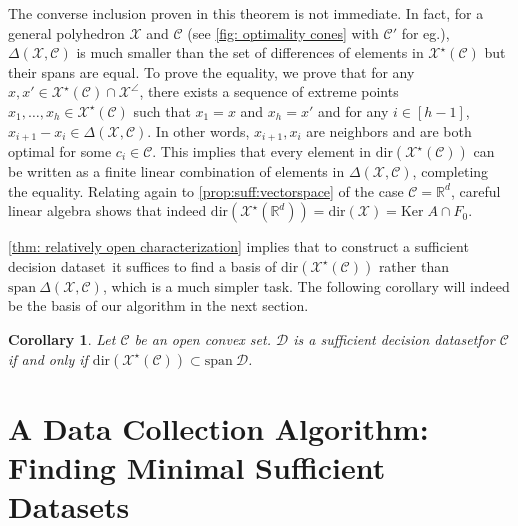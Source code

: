 \documentclass[11pt]{article}
\theoremstyle{plain}
\newtheorem{corollary}{Corollary}
\theoremstyle{definition}
\newcommand{\Ker}[0]{\mathrm{Ker}\;}
\newcommand{\Vect}{\mathrm{span}~}
\newcommand{\dataset}[0]{\mathcal D}
\newcommand{\sufficient}{sufficient decision dataset}
\newcommand{\cQ}{\mathcal Q}
\newcommand{\dualpoly}[2]{#1^\star\left(#2\right)}
\newcommand{\cX}{\mathcal{X}}
\newcommand{\cC}{\mathcal{C}}
\newcommand{\cD}{\mathcal{D}}
\renewcommand{\Re}{\mathbb{R}}
\newcommand{\dir}[1]{\mathrm{dir}\left(#1\right)}
\begin{document}
The converse inclusion proven in this theorem is not immediate. In fact, for a general polyhedron $\cX$ and $\cC$ (see \cref{fig: optimality cones} with $\cC'$ for eg.), $\Delta(\cX,\cC)$ is much smaller than the set of differences of elements in $\dualpoly{\cX}{\cC}$ but their spans are equal. To prove the equality, we prove that for any $x,x'\in \dualpoly{\cX}{\cC}\cap \cX^\angle$, there exists a sequence of extreme points $x_1,\dots,x_h \in \dualpoly{\cX}{\cC}$ such that $x_1=x$ and $x_h=x'$ and for any $i\in [h-1]$, $x_{i+1}-x_i\in \Delta(\cX,\cC)$. In other words, $x_{i+1},x_i$ are neighbors and are both optimal for some $c_i\in \cC$. This implies that every element in \(\dir{\dualpoly{\mathcal{X}}{\mathcal{C}}}\) can be written as a finite linear combination of elements in \(\Delta(\mathcal{X}, \mathcal{C})\), completing the equality. Relating again to \cref{prop:suff:vectorspace} of the case $\cC = \Re^d$, careful linear algebra shows that indeed $\dir{\cX^\star(\Re^d)} = \dir{\cX} = \Ker A \cap F_0$.

\cref{thm: relatively open characterization} implies that to construct a \sufficient\, it suffices to find
a basis of $\dir{\dualpoly{\cX}{\cC}}$ rather than $\Vect \Delta(\cX,\cC)$, which is a much simpler task. The following corollary will indeed be the basis of our algorithm in the next section.


\begin{corollary}\label{cor:dualpoly-carac}
    Let $\cC$ be an open convex set. $\dataset$ is a \sufficient \;for $\cC$ if and only if $\dir{\dualpoly{\cX}{\cC}} \subset \Vect \mathcal D$.
\end{corollary}


\section{A Data Collection Algorithm: Finding Minimal Sufficient Datasets} \label{sec:algorithm}


\end{document}
